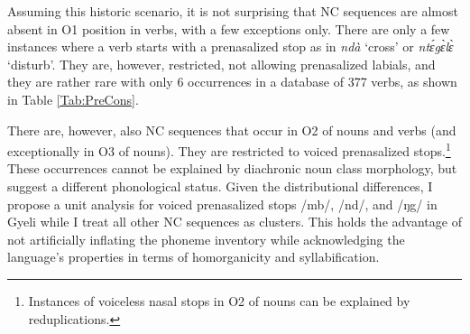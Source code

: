 Assuming this historic scenario, it is not surprising that NC sequences are almost absent in O1 position in verbs, with a few exceptions only. There are only a few instances where a verb starts with a prenasalized stop as in {\itshape ndà} `cross' or {\itshape ntɛ́gɛ̀lɛ̀} `disturb'. They are, however, restricted, not allowing prenasalized labials, and they are rather rare with only 6 occurrences in a database of 377 verbs, as shown in Table \ref{Tab:PreCons}.

There are, however, also NC sequences that occur in O2 of nouns and verbs (and exceptionally in O3 of nouns). They are restricted to voiced prenasalized stops.\footnote{Instances of voiceless nasal stops in O2 of nouns can be explained by reduplications.} These occurrences cannot be explained by diachronic noun class morphology, but suggest a different phonological status. Given the distributional differences, I propose a unit analysis for voiced prenasalized stops /mb/, /nd/, and /ŋg/ in Gyeli while I treat all other NC sequences as clusters. This holds the advantage of not artificially inflating the phoneme inventory while acknowledging the language's properties in terms of homorganicity and syllabification.







